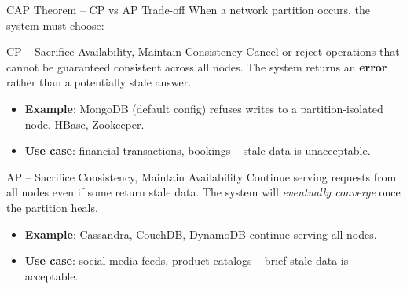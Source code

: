 \begin{frame}{CAP Theorem -- CP vs AP Trade-off}
  When a network partition occurs, the system must choose:

  \begin{block}{CP -- Sacrifice Availability, Maintain Consistency}
    Cancel or reject operations that cannot be guaranteed consistent across all nodes.
    The system returns an \textbf{error} rather than a potentially stale answer.
    \begin{itemize}
      \item \textbf{Example}: MongoDB (default config) refuses writes to a
            partition-isolated node. HBase, Zookeeper.
      \item \textbf{Use case}: financial transactions, bookings -- stale data is unacceptable.
    \end{itemize}
  \end{block}

  \begin{block}{AP -- Sacrifice Consistency, Maintain Availability}
    Continue serving requests from all nodes even if some return stale data.
    The system will \emph{eventually converge} once the partition heals.
    \begin{itemize}
      \item \textbf{Example}: Cassandra, CouchDB, DynamoDB continue serving all nodes.
      \item \textbf{Use case}: social media feeds, product catalogs -- brief stale data is acceptable.
    \end{itemize}
  \end{block}
\end{frame}

